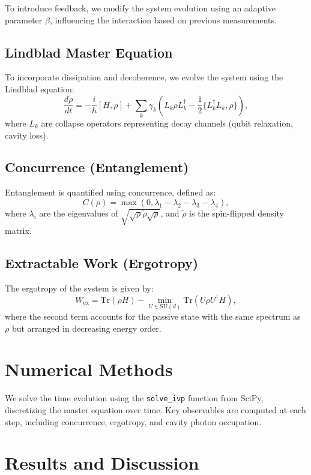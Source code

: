 \documentclass[a4paper,12pt]{article}
\begin{document}
To introduce feedback, we modify the system evolution using an adaptive parameter $\beta$, influencing the interaction 
based on previous measurements.

\subsection{Lindblad Master Equation}
To incorporate dissipation and decoherence, we evolve the system using the Lindblad equation:
\begin{equation}
\frac{d\rho}{dt} = -\frac{i}{\hbar} [H, \rho] + \sum_k \gamma_k \left( L_k \rho L_k^\dagger - \frac{1}{2} \{L_k^\dagger L_k, \rho\} \right),
\end{equation}
where $L_k$ are collapse operators representing decay channels (qubit relaxation, cavity loss).

\subsection{Concurrence (Entanglement)}
Entanglement is quantified using concurrence, defined as:
\begin{equation}
C(\rho) = \max(0, \lambda_1 - \lambda_2 - \lambda_3 - \lambda_4),
\end{equation}
where $\lambda_i$ are the eigenvalues of $\sqrt{\sqrt{\rho} \tilde{\rho} \sqrt{\rho}}$, and 
$\tilde{\rho}$ is the spin-flipped density matrix.

\subsection{Extractable Work (Ergotropy)}
The ergotropy of the system is given by:
\begin{equation}
W_{\text{ex}} = \text{Tr}(\rho H) - \min_{U \in \text{SU}(d)} \text{Tr}(U\rho U^\dagger H),
\end{equation}
where the second term accounts for the passive state with the same spectrum as $\rho$ but arranged in decreasing energy order.

\section{Numerical Methods}
We solve the time evolution using the \texttt{solve\_ivp} function from SciPy, discretizing the master equation over time. 
Key observables are computed at each step, including concurrence, ergotropy, and cavity photon occupation.

\section{Results and Discussion}
\end{document}
